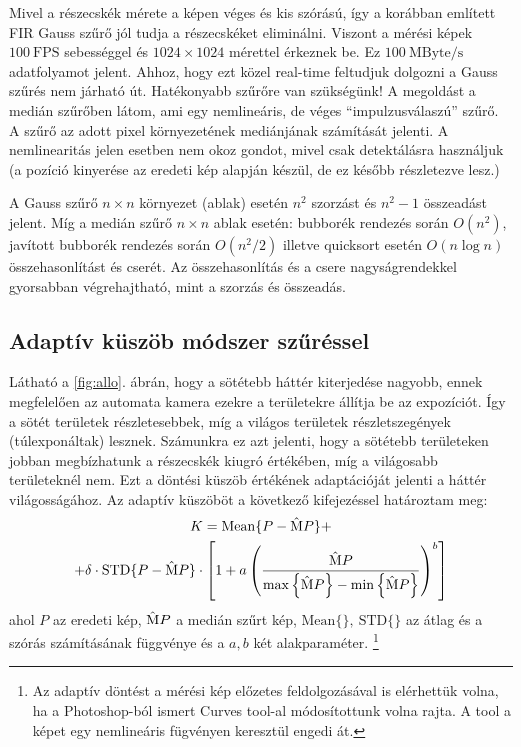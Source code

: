 	Mivel a részecskék mérete a képen véges és kis szórású, így a korábban
	említett FIR Gauss szűrő jól tudja a részecskéket eliminálni.
	Viszont a mérési képek $100\ \mathrm{FPS}$ sebességgel és $1024\times1024$ mérettel érkeznek be.
	Ez $100\ \mathrm{MByte/s}$ adatfolyamot jelent. Ahhoz, hogy ezt közel real-time feltudjuk dolgozni
	a Gauss szűrés nem járható út. Hatékonyabb szűrőre van szükségünk! A megoldást a medián szűrőben látom,
	ami egy nemlineáris, de véges ``impulzusválaszú'' szűrő.
	A szűrő az adott pixel környezetének mediánjának számítását jelenti.
	A nemlinearitás jelen esetben nem okoz gondot, mivel csak detektálásra használjuk (a pozíció
	kinyerése az eredeti kép alapján készül, de ez később részletezve lesz.)
	
	A Gauss szűrő $n\times n$ környezet (ablak) esetén $n^2$ szorzást és $n^2-1$ összeadást jelent. Míg
	a medián szűrő $n\times n$ ablak esetén: bubborék rendezés során $O(n^2)$, javított bubborék
	rendezés során $O(n^2 / 2)$ illetve quicksort esetén $O(n\log n)$ összehasonlítást és
	cserét. Az összehasonlítás és a csere nagyságrendekkel gyorsabban végrehajtható, mint a szorzás és
	összeadás.
	
\subsection{Adaptív küszöb módszer szűréssel}
	Látható a \ref{fig:allo}. ábrán, hogy a sötétebb háttér kiterjedése nagyobb, ennek megfelelően az
	automata kamera ezekre a területekre állítja be az expozíciót.
	Így a sötét területek részletesebbek, míg a világos területek részletszegények (túlexponáltak) lesznek.
	Számunkra ez azt jelenti, hogy a sötétebb területeken jobban megbízhatunk a részecskék kiugró
	értékében, míg a világosabb területeknél nem.
	Ezt a döntési küszöb értékének adaptációját jelenti a háttér világosságához.
	Az adaptív küszöböt a következő kifejezéssel határoztam meg:
	\begin{multline}
		\label{eq:treshold}
		K = \mathrm{Mean}\{P-\mathrm{\hat{M}}P\}+\\
		  + \delta \cdot \mathrm{STD}\{P - \mathrm{\hat{M}}P\} \cdot 
		\left[ 1+ a \left(
			\frac{\mathrm{\hat{M}}P}{\max\left\{\mathrm{\hat{M}}P\right\} - \min\left\{\mathrm{\hat{M}}P\right\}}
			\right)^b
		\right]
	\end{multline}
	ahol $P$ az eredeti kép, $\mathrm{\hat{M}} P$ a medián szűrt kép, $\mathrm{Mean}\{\},\ \mathrm{STD}\{\}$ az
	átlag és a szórás számításának függvénye és a $a,b$ két alakparaméter.
	\footnote{Az adaptív döntést a mérési kép előzetes feldolgozásával is elérhettük volna,
	ha a Photoshop-ból ismert Curves tool-al módosítottunk volna rajta. A tool a képet egy nemlineáris
	fügvényen keresztül engedi át.}
	
